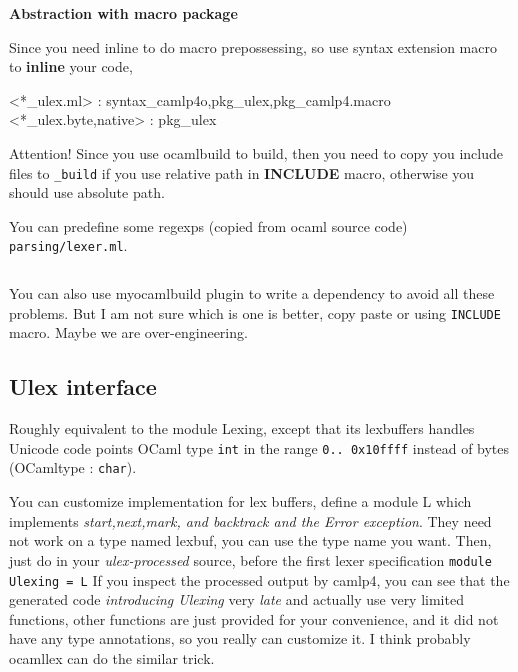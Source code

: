 \textbf{Abstraction with macro package} 

Since you need inline to do macro prepossessing, so use syntax
extension macro to \textbf{ inline} your code,


\begin{bluetext}
 <*_ulex.ml> : syntax_camlp4o,pkg_ulex,pkg_camlp4.macro
 <*_ulex.{byte,native}> : pkg_ulex
\end{bluetext}

Attention!  Since you use ocamlbuild to build, then you need to copy
you include files to \verb|_build| if you use relative path in
\textbf{INCLUDE} macro, otherwise you should use absolute path.

 You can predefine some regexps (copied from ocaml source code)
\verb| parsing/lexer.ml|.

\inputminted[fontsize=\scriptsize, fontsize=\scriptsize, ]{ocaml}{/Users/bobzhang1988/predefine_ulex.ml}

You can also use myocamlbuild plugin to write a dependency to avoid
all these problems. But I am not sure which is one is better, copy
paste or using \verb|INCLUDE| macro. Maybe we are over-engineering.


\subsection{Ulex interface}

Roughly equivalent to the module Lexing, except that its lexbuffers
handles Unicode code points  OCaml type \verb|int| in the range
\verb|0.. 0x10ffff| instead of bytes (OCamltype : \verb|char|).

You can customize implementation for lex buffers, define a module L
which implements \emph{start,next,mark, and backtrack and the Error
  exception}.  They need not work on a type named lexbuf, you can use
the type name you want.  Then, just do in your \emph{ulex-processed}
source, before the first lexer specification \verb|module Ulexing = L|
If you inspect the processed output by camlp4, you can see that the
generated code \emph{introducing Ulexing } very \emph{late} and
actually use very limited functions, other functions are just provided
for your convenience, and it did not have any type annotations, so you
really can customize it. I think probably ocamllex can do the similar
trick.
    
\inputminted[fontsize=\scriptsize,
             fontsize=\scriptsize, ]{ocaml}{lexing/code/ulex/ulex_intf.mli}
    
